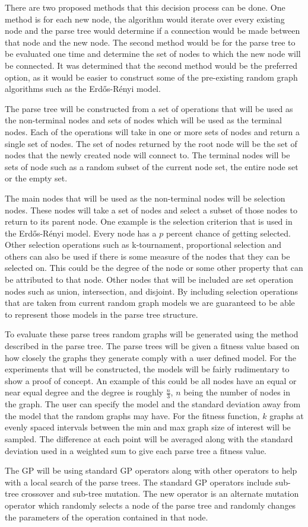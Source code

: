 \documentclass{article}
\begin{document}
There are two proposed methods that this decision process can be done. One method is for each new node, the algorithm would iterate over every existing node and the parse tree would determine if a connection would be made between that node and the new node. The second method would be for the parse tree to be evaluated one time and determine the set of nodes to which the new node will be connected.  It was determined that the second method would be the preferred option, as it would be easier to construct some of the pre-existing random graph algorithms such as the Erd\H{o}s-R\'{e}nyi model.

The parse tree will be constructed from a set of operations that will be used as the non-terminal nodes and sets of nodes which will be used as the terminal nodes.  Each of the operations will take in one or more sets of nodes and return a single set of nodes. The set of nodes returned by the root node will be the set of nodes that the newly created node will connect to. The terminal nodes will be sets of node such as a random subset of the current node set, the entire node set or the empty set.

The main nodes that will be used as the non-terminal nodes will be selection nodes. These nodes will take a set of nodes and select a subset of those nodes to return to its parent node. One example is the selection criterion that is used in the Erd\H{o}s-R\'{e}nyi model. Every node has a $p$ percent chance of getting selected.  Other selection operations such as k-tournament, proportional selection and others can also be used if there is some measure of the nodes that they can be selected on. This could be the degree of the node or some other property that can be attributed to that node.  Other nodes that will be included are set operation nodes such as union, intersection, and disjoint.  By including selection operations that are taken from current random graph models we are guaranteed to be able to represent those models in the parse tree structure.

To evaluate these parse trees random graphs will be generated using the method described in the parse tree. The parse trees will be given a fitness value based on how closely the graphs they generate comply with a user defined model. For the experiments that will be constructed, the models will be fairly rudimentary to show a proof of concept. An example of this could be all nodes have an equal or near equal degree and the degree is roughly $\frac{n}{3}$, $n$ being the number of nodes in the graph.  The user can specify the model and the standard deviation away from the model that the random graphs may have. For the fitness function, $k$ graphs at evenly spaced intervals between the min and max graph size of interest will be sampled. The difference at each point will be averaged along with the standard deviation used in a weighted sum to give each parse tree a fitness value.

The GP will be using standard GP operators along with other operators to help with a local search of the parse trees. The standard GP operators include sub-tree crossover and sub-tree mutation. The new operator is an alternate mutation operator which randomly selects a node of the parse tree and randomly changes the parameters of the operation contained in that node.
\end{document}
